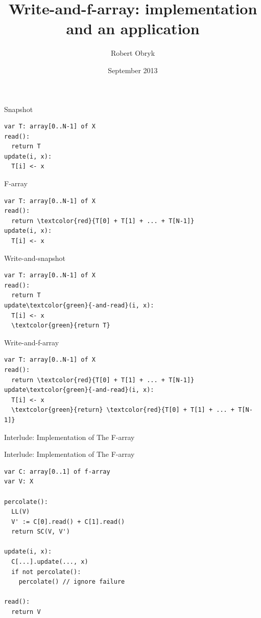 \documentclass{beamer}
\title{Write-and-f-array: implementation and an application}
\author{Robert Obryk}
\date{September 2013}
\begin{document}
\frame{\titlepage}
\begin{frame}[fragile]{Snapshot}
\begin{Verbatim}
var T: array[0..N-1] of X
read():
  return T
update(i, x):
  T[i] <- x
\end{Verbatim}
\end{frame}
\begin{frame}[fragile]{F-array}
\begin{Verbatim}
var T: array[0..N-1] of X
read():
  return \textcolor{red}{T[0] + T[1] + ... + T[N-1]}
update(i, x):
  T[i] <- x
\end{Verbatim}
\end{frame}
\begin{frame}[fragile]{Write-and-snapshot}
\begin{Verbatim}
var T: array[0..N-1] of X
read():
  return T
update\textcolor{green}{-and-read}(i, x):
  T[i] <- x
  \textcolor{green}{return T}
\end{Verbatim}
\end{frame}
\begin{frame}[fragile]{Write-and-f-array}
\begin{Verbatim}
var T: array[0..N-1] of X
read():
  return \textcolor{red}{T[0] + T[1] + ... + T[N-1]}
update\textcolor{green}{-and-read}(i, x):
  T[i] <- x
  \textcolor{green}{return} \textcolor{red}{T[0] + T[1] + ... + T[N-1]}
\end{Verbatim}
\end{frame}
\begin{frame}{Interlude: Implementation of The F-array}
\end{frame}

\begin{frame}[fragile]{Interlude: Implementation of The F-array}
\begin{Verbatim}
var C: array[0..1] of f-array
var V: X

percolate():
  LL(V)
  V' := C[0].read() + C[1].read()
  return SC(V, V')

update(i, x):
  C[...].update(..., x)
  if not percolate():
    percolate() // ignore failure

read():
  return V
\end{Verbatim}
\end{frame}
\end{document}
